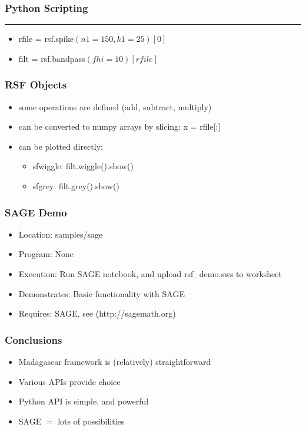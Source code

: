\begin{frame} \frametitle{Python Scripting}
\hrule
\pause
\begin{itemize}
\item rfile = rsf.spike$(n1=150,k1=25)[0]$
\item filt = rsf.bandpass$(fhi=10)[rfile]$
\end{itemize}
\end{frame} 

\begin{frame} \frametitle{RSF Objects}
\begin{itemize}
\item some operations are defined (add, subtract, multiply)
\item can be converted to numpy arrays by slicing: x = rfile[:]
\item can be plotted directly: 
\begin{itemize}
\item sfwiggle: filt.wiggle().show()
\item sfgrey: filt.grey().show()
\end{itemize}
\end{itemize}
\end{frame}

\begin{frame}
\end{frame}

\begin{frame} \frametitle{SAGE Demo}
\begin{itemize}
\item Location: samples/sage
\item Program:  None
\item Execution: Run SAGE notebook, and upload rsf\_demo.sws to worksheet
\item Demonstrates: Basic functionality with SAGE
\item Requires: SAGE, see (http://sagemath.org)
\end{itemize}
\end{frame}

\begin{frame} \frametitle{Conclusions}
\begin{itemize}
\item Madagascar framework is (relatively) straightforward
\item Various APIs provide choice
\item Python API is simple, and powerful
\item SAGE $=$ lots of possibilities
\end{itemize}
\end{frame}
